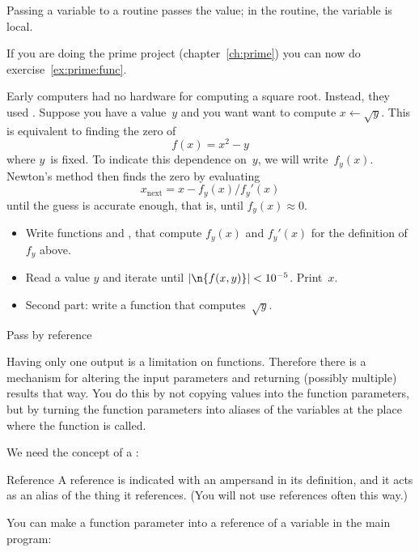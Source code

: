 Passing a variable to a routine passes the value; in the routine, the
variable is local.


If you are doing the prime project (chapter~\ref{ch:prime}) you can
now do exercise~\ref{ex:prime:func}.

\begin{exercise}
  \label{ex:newton-root}
  Early computers had no hardware for computing a square
  root. Instead, they used . Suppose you
  have a value~$y$ and you want want to compute
  $x\leftarrow\sqrt{y}$. This is equivalent to finding the zero of
  \[ f(x) = x^2-y \] where $y$~is fixed. To indicate this dependence
  on~$y$, we will write~$f_y(x)$. Newton's method then finds the zero by
  evaluating
  \[ x_{\mathrm{next}}=x-f_y(x)/f_y'(x) \]
  until the guess is accurate enough, that is, until $f_y(x)\approx0$.
  \begin{itemize}
  \item Write functions  and , that compute
    $f_y(x)$ and $f_y'(x)$ for the definition of $f_y$ above.
  \item Read a value $y$ and iterate until $|\n{f(x,y)}|<10^{-5}$. Print~$x$.
  \item Second part: write a function  that computes~$\sqrt{y}$.
  \end{itemize}
\end{exercise}

 {Pass by reference}
\label{sec:pass-by-ref}
  
Having only one output is a limitation on functions. Therefore there
is a mechanism for altering the input parameters and returning
(possibly multiple) results that way. You do this by not copying
values into the function parameters, but by turning the function
parameters into aliases of the variables at the place where the
function is called.

We need the concept of a :
\begin{block}{Reference}
  \label{sl:cpp-reference}
  A reference is indicated with an ampersand in its definition, and it
  acts as an alias of the thing it references.
  (You will not use references often this way.)
\end{block}

You can make a function parameter into a reference of a variable in
the main program:


